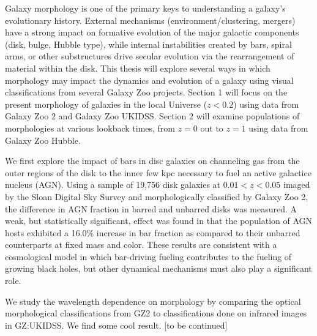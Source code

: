 


Galaxy morphology is one of the primary keys to understanding a galaxy's evolutionary history. External mechanisms (environment/clustering, mergers) have a strong impact on formative evolution of the major galactic components (disk, bulge, Hubble type), while internal instabilities created by bars, spiral arms, or other substructures drive secular evolution via the rearrangement of material within the disk. This thesis will explore several ways in which morphology may impact the dynamics and evolution of a galaxy using visual classifications from several Galaxy Zoo projects. Section 1 will focus on the present morphology of galaxies in the local Universe ($z<0.2$) using data from Galaxy Zoo 2 and Galaxy Zoo UKIDSS. Section 2 will examine populations of morphologies at various lookback times, from $z=0$ out to $z=1$ using data from Galaxy Zoo Hubble.


We first explore the impact of bars in disc galaxies on channeling gas from the outer regions of the disk to the inner few kpc necessary to fuel an active galactice nucleus (AGN). Using a sample of 19,756 disk galaxies at $0.01 < z < 0.05$ imaged by the Sloan Digital Sky Survey and morphologically classified by Galaxy Zoo 2, the difference in AGN fraction in barred and unbarred disks was measured. A weak, but statistically significant, effect was found in that the population of AGN hosts exhibited a 16.0\% increase in bar fraction as compared to their unbarred counterparts at fixed mass and color. These results are consistent with a cosmological model in which bar-driving fueling contributes to the fueling of growing black holes, but other dynamical mechanisms must also play a significant role. 

We study the wavelength dependence on morphology by comparing the optical morphological classifications from GZ2 to classifications done on infrared images in GZ:UKIDSS. We find some cool result. [to be continued]

